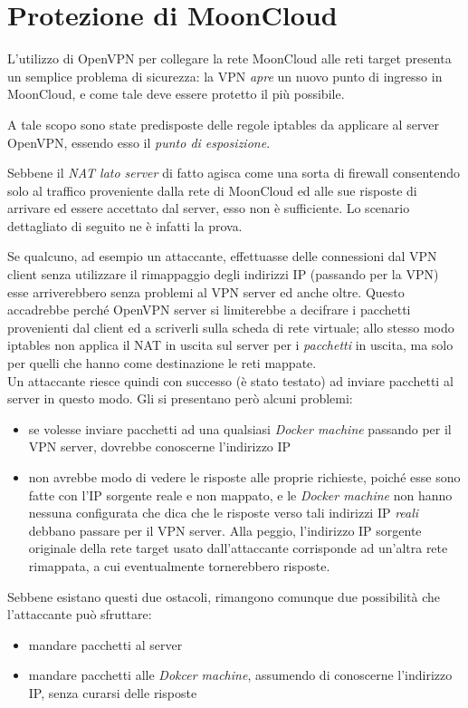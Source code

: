 \section{Protezione di MoonCloud}
L'utilizzo di OpenVPN per collegare la rete MoonCloud alle reti
target presenta un semplice problema di sicurezza: la VPN \textit{apre}
un nuovo punto di ingresso in MoonCloud, e come tale deve essere protetto
il più possibile.

A tale scopo sono state predisposte delle regole iptables da applicare
al server OpenVPN, essendo esso il \textit{punto di esposizione}.


Sebbene il \textit{NAT lato server} di fatto agisca come una sorta
di firewall consentendo solo al traffico proveniente dalla rete
di MoonCloud ed alle sue risposte di arrivare ed essere accettato
dal server, esso non è sufficiente. Lo scenario dettagliato di seguito
ne è infatti la prova.


Se qualcuno, ad esempio un attaccante,
effettuasse delle connessioni dal VPN client senza utilizzare il rimappaggio
degli indirizzi IP (passando per la VPN) esse arriverebbero senza problemi
al VPN server ed anche oltre. Questo accadrebbe perché OpenVPN server si limiterebbe
a decifrare i pacchetti provenienti dal client ed a scriverli sulla scheda di rete
virtuale; allo stesso modo iptables non applica il NAT in uscita sul server per
i \textit{pacchetti} in uscita, ma solo per quelli che hanno come destinazione
le reti mappate.\\
Un attaccante riesce quindi con successo (è stato testato) ad inviare pacchetti
al server in questo modo.
Gli si presentano però alcuni problemi:
\begin{itemize}
	\item se volesse inviare pacchetti ad una qualsiasi \textit{Docker machine}
	      passando per il VPN server, dovrebbe conoscerne l'indirizzo IP
	\item non avrebbe modo di vedere le risposte alle proprie richieste, poiché
	      esse sono fatte con l'IP sorgente reale e non mappato, e le \textit{Docker machine}
	      non hanno nessuna configurata che dica che le risposte verso tali indirizzi
	      IP \textit{reali} debbano passare per il VPN server. Alla peggio, l'indirizzo IP
	      sorgente originale della rete target usato dall'attaccante corrisponde
	      ad un'altra rete rimappata, a cui eventualmente tornerebbero risposte.
\end{itemize}
Sebbene esistano questi due ostacoli, rimangono comunque due possibilità che
l'attaccante può sfruttare:
\begin{itemize}
	\item mandare pacchetti al server
	\item mandare pacchetti alle \textit{Dokcer machine}, assumendo di conoscerne
	      l'indirizzo IP, senza curarsi delle risposte
\end{itemize}

